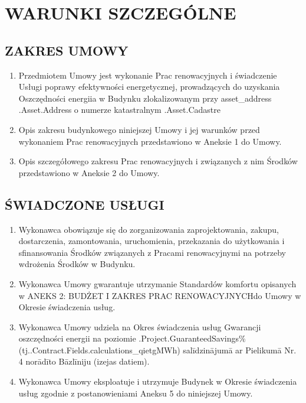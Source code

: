 \section{WARUNKI SZCZEGÓLNE}
\subsection{ZAKRES UMOWY}
\begin{enumerate}
	\item Przedmiotem Umowy jest wykonanie Prac renowacyjnych i świadczenie Usługi poprawy efektywności energetycznej, prowadzących do uzyskania Oszczędności energiia w Budynku zlokalizowanym przy {{asset_address .Asset.Address}} o numerze katastralnym {{.Asset.Cadastre}}
	\item Opis zakresu budynkowego niniejszej Umowy i jej warunków przed wykonaniem Prac renowacyjnych przedstawiono w Aneksie 1 do Umowy.
	\item Opis szczegółowego zakresu Prac renowacyjnych i związanych z nim Środków przedstawiono w Aneksie 2 do Umowy.
\end{enumerate}

\subsection{ŚWIADCZONE USŁUGI}
\begin{enumerate}
	\item Wykonawca obowiązuje się do zorganizowania zaprojektowania, zakupu, dostarczenia, zamontowania, uruchomienia, przekazania do użytkowania i sfinansowania Środków związanych z Pracami renowacyjnymi na potrzeby wdrożenia Środków w Budynku.
	\item Wykonawca Umowy gwarantuje utrzymanie Standardów komfortu opisanych w ANEKS 2: BUDŻET I ZAKRES PRAC RENOWACYJNYCHdo Umowy w Okresie świadczenia usług.
	\item Wykonawca Umowy udziela na Okres świadczenia usług Gwarancji oszczędności energii na poziomie {{.Project.GuaranteedSavings}}\% (tj.{{.Contract.Fields.calculations_qietg}}MWh) salīdzinājumā ar Pielikumā Nr. 4 norādīto Bāzlīniju (izejas datiem).
	\item Wykonawca Umowy eksploatuje i utrzymuje Budynek w Okresie świadczenia usług zgodnie z postanowieniami Aneksu 5 do niniejszej Umowy.
\end{enumerate}

